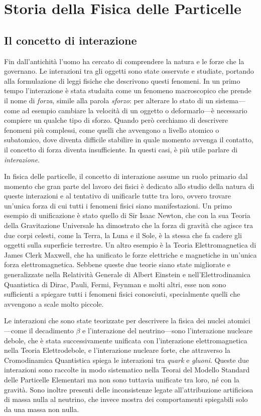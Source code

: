 \chapter{Storia della Fisica delle Particelle}
    \section{Il concetto di interazione}
        Fin dall'antichità l'uomo ha cercato di comprendere la natura e le forze che la governano. Le interazioni tra gli oggetti sono state osservate e studiate, portando alla formulazione di leggi fisiche che descrivono questi fenomeni. In un primo tempo l'interazione è stata studaita come un fenomeno macroscopico che prende il nome di \emph{forza}, simile alla parola \emph{sforzo}: per alterare lo stato di un sistema---come ad esempio cambiare la velocità di un oggetto o deformarlo---è necessario compiere un qualche tipo di sforzo. Quando però cerchiamo di descrivere fenomeni più complessi, come quelli che avvengono a livello atomico o subatomico, dove diventa difficile stabilire in quale momento avvenga il contatto, il concetto di forza diventa insufficiente. In questi casi, è più utile parlare di \emph{interazione}.
        
        In fisica delle particelle, il concetto di interazione assume un ruolo primario dal momento che gran parte del lavoro dei fisici è dedicato allo studio della natura di queste interazioni e al tentativo di unificarle tutte tra loro, ovvero trovare un'unica forza di cui tutti i fenomeni fisici siano manifestazioni. Un primo esempio di unificazione è stato quello di Sir Isaac Newton, che con la sua Teoria della Gravitazione Universale ha dimostrato che la forza di gravità che agisce tra due corpi celesti, come la Terra, la Luna e il Sole, è la stessa che fa cadere gli oggetti sulla superficie terrestre. Un altro esempio è la Teoria Elettromagnetica di James Clerk Maxwell, che ha unificato le forze elettriche e magnetiche in un'unica forza elettromagnetica. Sebbene queste due teorie siano state migliorate e generalizzate nella Relatività Generale di Albert Einstein e nell'Elettrodinamica Quantistica di Dirac, Pauli, Fermi, Feynman e molti altri, esse non sono sufficienti a spiegare tutti i fenomeni fisici conosciuti, specialmente quelli che avvengono a scale molto piccole.

        Le interazioni che sono state teorizzate per descrivere la fisica dei nuclei atomici---come il decadimento $\beta$ e l'interazione del neutrino---sono l'interazione nucleare debole, che è stata successivamente unificata con l'interazione elettromagnetica nella Teoria Elettrodebole, e l'interazione nucleare forte, che attraverso la Cromodinamica Quantistica spiega le interazioni tra \emph{quark} e \emph{gluoni}. Queste due interazioni sono raccolte in modo sistematico nella Teorai del Modello Standard delle Particelle Elementari ma non sono tuttavia unificate tra loro, né con la gravità. Sono inoltre presenti delle inconsistenze legate all'attribuzione artificiosa di massa nulla al neutrino, che invece mostra dei comportamenti spiegabili solo da una massa non nulla.

